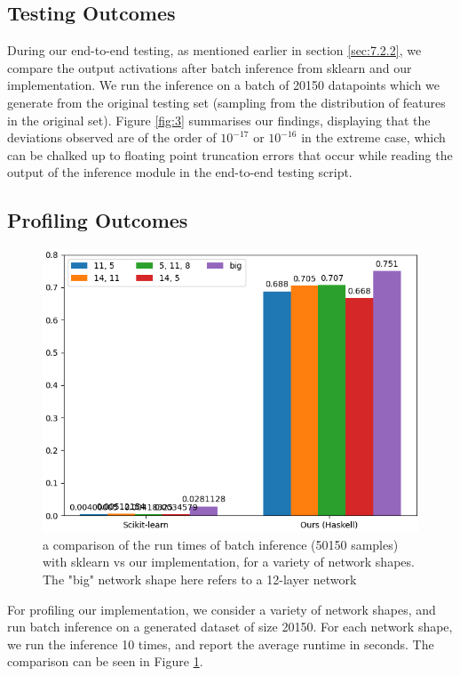 \documentclass[12pt, titlepage]{article}
\begin{document}
\subsection{Testing Outcomes}
During our end-to-end testing, as mentioned earlier in section \ref{sec:7.2.2}, we compare the output activations after batch inference from sklearn and our implementation. We run the inference on a batch of 20150 datapoints which we generate from the original testing set (sampling from the distribution of features in the original set). Figure \ref{fig:3} summarises our findings, displaying that the deviations observed are of the order of $10^{-17}$ or $10^{-16}$ in the extreme case, which can be chalked up to floating point truncation errors that occur while reading the output of the inference module in the end-to-end testing script.

\subsection{Profiling Outcomes}
\begin{figure}
	\includegraphics[width=\textwidth]{../images/benchmark.png}
	\caption{\centering \label{fig:4}a comparison of the run times of batch inference (50150 samples) with sklearn vs our implementation, for a variety of network shapes. The "big" network shape here refers to a 12-layer network}
\end{figure}
For profiling our implementation, we consider a variety of network shapes, and run batch inference on a generated dataset of size 20150. For each network shape, we run the inference 10 times, and report the average runtime in seconds. The comparison can be seen in Figure \ref{fig:4}.\bigskip
\end{document}
